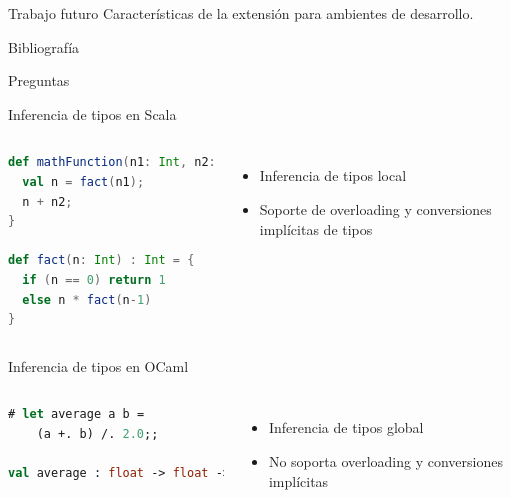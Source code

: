 \documentclass[aspectratio=169,10pt]{beamer}
\begin{document}
\begin{frame}[fragile]{Trabajo futuro}
	Características de la extensión para ambientes de desarrollo.
\end{frame}

\begin{frame}[fragile]{Bibliografía}

  
  

\end{frame}

{
\begin{frame}[standout]
  Preguntas
\end{frame}
}

\appendix

\begin{frame}[fragile]{Inferencia de tipos en Scala}
	\begin{columns}[T,onlytextwidth]
\begin{lstlisting}[language=Scala,basicstyle=\fontsize{9}{9}\ttfamily]
def mathFunction(n1: Int, n2: Float) = {
  val n = fact(n1);
  n + n2;
}

def fact(n: Int) : Int = {
  if (n == 0) return 1
  else n * fact(n-1)
}
\end{lstlisting}
		\begin{itemize}
			\item Inferencia de tipos local
			\item Soporte de overloading y conversiones implícitas de tipos
		\end{itemize}
	\end{columns}
\end{frame}

\begin{frame}[fragile]{Inferencia de tipos en OCaml}
	\begin{columns}[T,onlytextwidth]
\begin{lstlisting}[language=ML,basicstyle=\fontsize{9}{9}\ttfamily]
# let average a b =
    (a +. b) /. 2.0;;

val average : float -> float -> float
\end{lstlisting}
\begin{itemize}
	\item Inferencia de tipos global
	\item No soporta overloading y conversiones implícitas
\end{itemize}
	\end{columns}
\end{frame}
\end{document}
